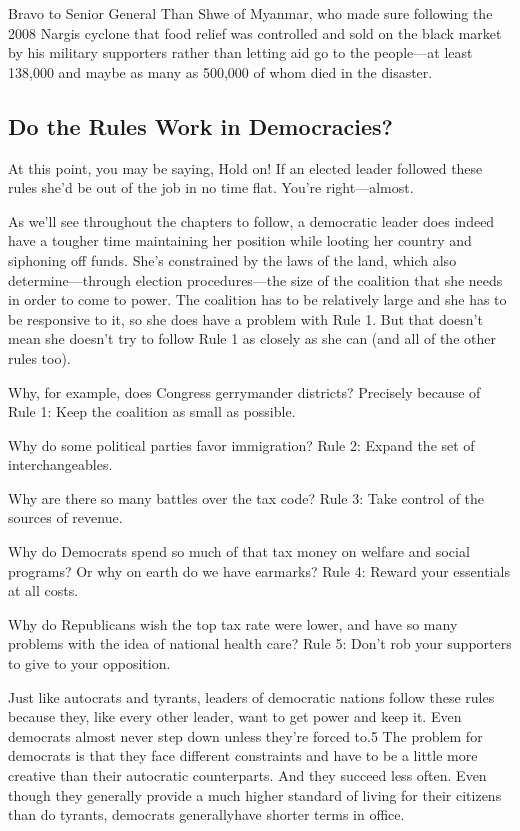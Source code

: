 \documentclass[10pt]{article}
\begin{document}
{\large Bravo to Senior General Than Shwe of Myanmar, who made sure following
the 2008 Nargis cyclone that food relief was controlled and sold on the black
market by his military supporters rather than letting aid go to the people---at
least 138,000 and maybe as many as 500,000 of whom died in the disaster.}

\subsection{Do the Rules Work in Democracies?}

{\large At this point, you may be saying, Hold on! If an elected leader followed
these rules she'd be out of the job in no time flat. You're right---almost.}

{\large As we'll see throughout the chapters to follow, a democratic leader does
indeed have a tougher time maintaining her position while looting her country and
siphoning off funds. She's constrained by the laws of the land, which also
determine---through election procedures---the size of the coalition that she
needs in order to come to power. The coalition has to be relatively large and she
has to be responsive to it, so she does have a problem with Rule 1. But that
doesn't mean she doesn't try to follow Rule 1 as closely as she can (and all of
the other rules too).}

{\large Why, for example, does Congress gerrymander districts? Precisely because
of Rule 1: Keep the coalition as small as possible.}

{\large Why do some political parties favor immigration? Rule 2: Expand the set
of interchangeables.}

{\large Why are there so many battles over the tax code? Rule 3: Take control of
the sources of revenue.}

{\large Why do Democrats spend so much of that tax money on welfare and social
programs? Or why on earth do we have earmarks? Rule 4: Reward your essentials at
all costs.}

{\large Why do Republicans wish the top tax rate were lower, and have so many
problems with the idea of national health care? Rule 5: Don't rob your supporters
to give to your opposition.}

{\large Just like autocrats and tyrants, leaders of democratic nations follow
these rules because they, like every other leader, want to get power and keep it.
Even democrats almost never step down unless they're forced to.5 The problem for
democrats is that they face different constraints and have to be a little more
creative than their autocratic counterparts. And they succeed less often. Even
though they generally provide a much higher standard of living for their citizens
than do tyrants, democrats generallyhave shorter terms in office.}
\end{document}
